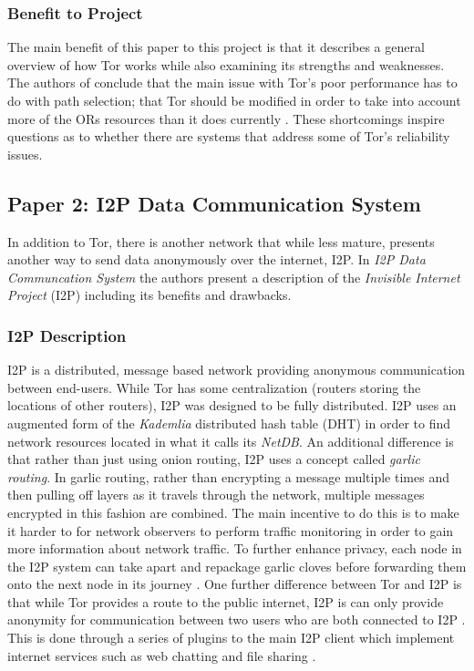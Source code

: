\documentclass[notitlepage,12pt]{article}
\begin{document}
\subsubsection{Benefit to Project}
\label{sec:benp1}

The main benefit of this paper to this project is that it describes a general overview of how
Tor works while also examining its strengths and weaknesses. The authors of
\cite{tor} conclude that the main issue with Tor's poor performance has to do
with path selection; that Tor should be modified in order to take into account
more of the ORs resources than it does currently \cite[p. 7]{tor}. These
shortcomings inspire questions as to whether there are systems that address some
of Tor's reliability issues.

\subsection{Paper 2: I2P Data Communication System}
\label{sec:i2p}

In addition to Tor, there is another network that while less mature, presents
another way to send data anonymously over the internet, I2P. In \emph{I2P Data
  Communcation System} the authors present a description of the \emph{Invisible
  Internet Project} (I2P) including its benefits and drawbacks.

\subsubsection{I2P Description}
\label{sec:i2pdescr} 

I2P is a distributed, message based network providing anonymous communication
between end-users. While Tor has some centralization (routers storing the
locations of other routers), I2P was designed to be fully distributed. I2P uses
an augmented form of the \emph{Kademlia} distributed hash table (DHT) in order
to find network resources located in what it calls its
\emph{NetDB}\cite[p. 401]{i2p}. An additional difference is that rather than
just using onion routing, I2P uses a concept called \emph{garlic routing}. In
garlic routing, rather than encrypting a message multiple times and then pulling
off layers as it travels through the network, multiple messages encrypted in
this fashion are combined. The main incentive to do this is to make it harder to
for network observers to perform traffic monitoring in order to gain more
information about network traffic. To further enhance privacy, each node in the
I2P system can take apart and repackage garlic cloves before forwarding them
onto the next node in its journey \cite[p. 402]{i2p}. One further difference
between Tor and I2P is that while Tor provides a route to the public internet,
I2P is can only provide anonymity for communication between two users who are
both connected to I2P \cite[p. 405]{i2p}. This is done through a series of
plugins to the main I2P client which implement internet services such as web
chatting and file sharing \cite[p. 406]{i2p}.
\end{document}
